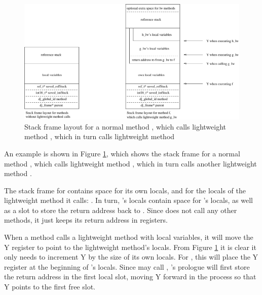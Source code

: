 
\begin{figure}
\centering
\includegraphics[width=0.95\linewidth]{stack-frame-lightweight-method.eps}
\caption{Stack frame layout for a normal method , which calls lightweight method , which in turn calls lightweight method }
\label{fig-stack-frame-lightweight-method}
\end{figure}

An example is shown in Figure \ref{fig-stack-frame-lightweight-method}, which shows the stack frame for a normal method , which calls lightweight method , which in turn calls another lightweight method .

The stack frame for  contains space for its own locals, and for the locals of the lightweight method it calls: . In turn, 's locals contain space for 's locals, as well as a slot to store the return address back to . Since  does not call any other methods, it just keeps its return address in registers.

When a method calls a lightweight method with local variables, it will move the Y register to point to the lightweight method's locals. From Figure \ref{fig-stack-frame-lightweight-method} it is clear it only needs to increment Y by the size of its own locals. For , this will place the Y register at the beginning of 's locals. Since  may call , 's prologue will first store the return address in the first local slot, moving Y forward in the process so that Y points to the first free slot.

